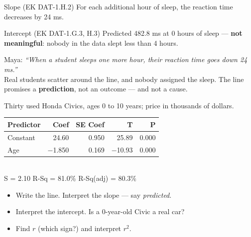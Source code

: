 \documentclass[aspectratio=169, 11pt]{beamer}
\begin{document}
\begin{frame}[t, plain]
  \vspace{4pt}
  \begin{block}{Slope (EK DAT-1.H.2)}
    For each additional hour of sleep, the  reaction time decreases by 24 ms.
  \end{block}
  \vspace{4pt}
  \begin{block}{Intercept (EK DAT-1.G.3, H.3)}
    Predicted 482.8 ms at 0 hours of sleep --- \textbf{not meaningful}: nobody in the data slept
    less than 4 hours.
  \end{block}
  \vspace{8pt}
  \begin{center}
    Maya: \emph{``When a student sleeps one more hour, their reaction time goes down 24 ms.''}\\[4pt]
    {\small\color{slate} Real students scatter around the line, and nobody assigned the sleep.
    The line promises a \textbf{prediction}, not an outcome --- and not a cause.}
  \end{center}
\end{frame}

\begin{frame}[t, plain]
  Thirty used Honda Civics, ages 0 to 10 years; price in thousands of dollars.
  \begin{center}
  {\small\ttfamily
  \begin{tabular}{@{} l r r r r @{}}
  Predictor & Coef & SE Coef & T & P \\ \hline
  Constant & 24.60 & 0.950 & 25.89 & 0.000 \\
  Age & $-$1.850 & 0.169 & $-$10.93 & 0.000 \\
  \end{tabular}\\[3pt]
  S = 2.10 \quad R-Sq = 81.0\% \quad R-Sq(adj) = 80.3\%}
  \end{center}
  \begin{itemize}\setlength{\itemsep}{3pt}
    \item Write the line. Interpret the slope --- say \emph{predicted}.
    \item Interpret the intercept. Is a 0-year-old Civic a real car?
    \item Find $r$ (which sign?) and interpret $r^2$.
  \end{itemize}
\end{frame}
\end{document}
